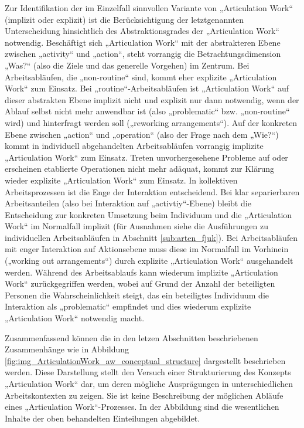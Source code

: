 Zur Identifikation der im Einzelfall sinnvollen Variante von „Articulation Work“ (implizit oder explizit) ist die Berücksichtigung der letztgenannten Unterscheidung hinsichtlich des Abstraktionsgrades der „Articulation Work“ notwendig. Beschäftigt sich „Articulation Work“ mit der abstrakteren Ebene zwischen „activity“ und „action“, steht vorrangig die Betrachtungsdimension „Was?“ (also die Ziele und das generelle Vorgehen) im Zentrum. Bei Arbeitsabläufen, die „non-routine“ sind, kommt eher explizite „Articulation Work“ zum Einsatz. Bei „routine“-Arbeitsabläufen ist „Articulation Work“ auf dieser abstrakten Ebene implizit nicht und explizit nur dann notwendig, wenn der Ablauf selbst nicht mehr anwendbar ist (also „problematic“ bzw. „non-routine“ wird) und hinterfragt werden soll („reworking arrangements“). Auf der konkreten Ebene zwischen „action“ und „operation“ (also der Frage nach dem „Wie?“) kommt in individuell abgehandelten Arbeitsabläufen vorrangig implizite „Articulation Work“ zum Einsatz. Treten unvorhergesehene Probleme auf oder erscheinen etablierte Operationen nicht mehr adäquat, kommt zur Klärung wieder explizite „Articulation Work“ zum Einsatz. In kollektiven Arbeitsprozessen ist die Enge der Interaktion entscheidend. Bei klar separierbaren Arbeitsanteilen (also bei Interaktion auf „activtiy“-Ebene) bleibt die Entscheidung zur konkreten Umsetzung beim Individuum und die „Articulation Work“ im Normalfall implizit (für Ausnahmen siehe die Ausführungen zu individuellen Arbeitsabläufen in Abschnitt \ref{sub:arten_fjuk}). Bei Arbeitsabläufen mit enger Interaktion auf Aktionsebene muss diese im Normalfall im Vorhinein („working out arrangements“) durch explizite „Articulation Work“ ausgehandelt werden. Während des Arbeitsablaufs kann wiederum implizite „Articulation Work“ zurückgegriffen werden, wobei auf Grund der Anzahl der beteiligten Personen die Wahrscheinlichkeit steigt, das ein beteiligtes Individuum die Interaktion als „problematic“ empfindet und dies wiederum explizite „Articulation Work“ notwendig macht.

Zusammenfassend können die in den letzen Abschnitten beschriebenen Zusammenhänge wie in Abbildung \ref{fig:img_ArticulationWork_aw_conceptual_structure} dargestellt beschrieben werden. Diese Darstellung stellt den Versuch einer Strukturierung des Konzepts „Articulation Work“ dar, um deren mögliche Ausprägungen in unterschiedlichen Arbeitskontexten zu zeigen. Sie ist keine Beschreibung der möglichen Abläufe eines „Articulation Work“-Prozesses. In der Abbildung sind die wesentlichen Inhalte der oben behandelten Einteilungen abgebildet.

